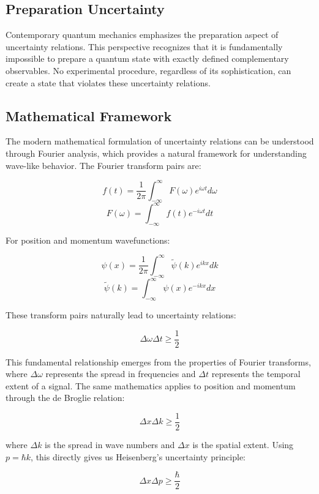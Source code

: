 \documentclass[
  a4paper,
]{book}
\begin{document}
\subsection{Preparation Uncertainty}\label{preparation-uncertainty}

Contemporary quantum mechanics emphasizes the preparation aspect of
uncertainty relations. This perspective recognizes that it is
fundamentally impossible to prepare a quantum state with exactly defined
complementary observables. No experimental procedure, regardless of its
sophistication, can create a state that violates these uncertainty
relations.

\subsection{Mathematical Framework}\label{mathematical-framework}

The modern mathematical formulation of uncertainty relations can be
understood through Fourier analysis, which provides a natural framework
for understanding wave-like behavior. The Fourier transform pairs are:

\[f(t) = \frac{1}{2\pi} \int_{-\infty}^{\infty} F(\omega) e^{i\omega t} d\omega\]
\[F(\omega) = \int_{-\infty}^{\infty} f(t) e^{-i\omega t} dt\]

For position and momentum wavefunctions:

\[\psi(x) = \frac{1}{2\pi} \int_{-\infty}^{\infty} \tilde{\psi}(k) e^{ikx} dk\]
\[\tilde{\psi}(k) = \int_{-\infty}^{\infty} \psi(x) e^{-ikx} dx\]

These transform pairs naturally lead to uncertainty relations:

\[\Delta \omega \Delta t \geq \frac{1}{2}\]

This fundamental relationship emerges from the properties of Fourier
transforms, where \(\Delta \omega\) represents the spread in frequencies
and \(\Delta t\) represents the temporal extent of a signal. The same
mathematics applies to position and momentum through the de Broglie
relation:

\[\Delta x \Delta k \geq \frac{1}{2}\]

where \(\Delta k\) is the spread in wave numbers and \(\Delta x\) is the
spatial extent. Using \(p = \hbar k\), this directly gives us
Heisenberg's uncertainty principle:

\[\Delta x \Delta p \geq \frac{\hbar}{2}\]
\end{document}
